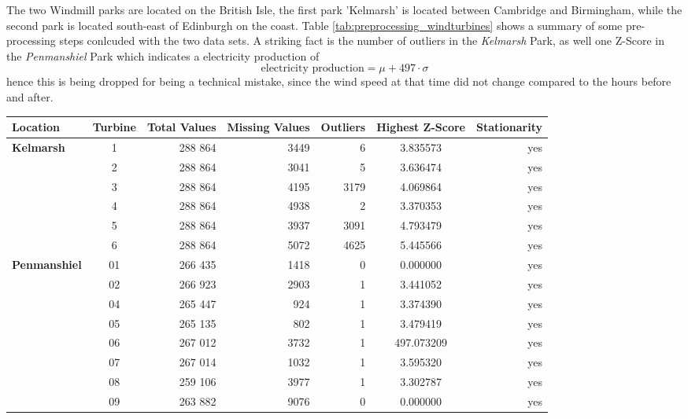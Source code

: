 \documentclass{article}
\begin{document}
The two Windmill parks are located on the British Isle, the first park 'Kelmarsh' is located between Cambridge and Birmingham, while the second park is located south-east of Edinburgh on the coast. 
Table \ref{tab:preprocessing_windturbines} shows a summary of some pre-processing steps conlcuded with the two data sets. A striking fact is the number of outliers in the \textit{Kelmarsh} Park, as well one Z-Score in the \textit{Penmanshiel} Park which indicates a electricity production of
\begin{equation*}
    \text{electricity production} = \mu + 497 \cdot \sigma
\end{equation*}
hence this is being dropped for being a technical mistake, since the wind speed at that time did not change compared to the hours before and after. 

\begin{table}[!ht]
\small
\centering
    \begin{tabular}{l|c|r|r|r|S|r}
    \toprule
    \textbf{Location} & \textbf{Turbine} & \textbf{Total Values} & \textbf{Missing Values} & \textbf{Outliers} & \textbf{Highest Z-Score} & \textbf{Stationarity} \\
    \midrule
\textbf{Kelmarsh} & 1 & 288 864 & 3449 & 6 & 3.835573 & yes \\
         & 2 & 288 864 & 3041 & 5 & 3.636474 & yes \\
         & 3 & 288 864 & 4195 & 3179 & 4.069864 & yes \\
         & 4 & 288 864 & 4938 & 2 & 3.370353 & yes \\
         & 5 & 288 864 & 3937 & 3091 & 4.793479 & yes \\
         & 6 & 288 864 & 5072 & 4625 & 5.445566 & yes \\
    \midrule
\textbf{Penmanshiel} & 01 & 266 435 & 1418 & 0 & 0.000000 & yes \\
            & 02 & 266 923 & 2903 & 1 & 3.441052 & yes \\
            & 04 & 265 447 & 924 & 1 & 3.374390 & yes \\
            & 05 & 265 135 & 802 & 1 & 3.479419 & yes \\
            & 06 & 267 012 & 3732 & 1 & 497.073209 & yes \\
            & 07 & 267 014 & 1032 & 1 & 3.595320 & yes \\
            & 08 & 259 106 & 3977 & 1 & 3.302787 & yes \\
            & 09 & 263 882 & 9076 & 0 & 0.000000 & yes \\

\end{tabular}
\end{table}
\end{document}

